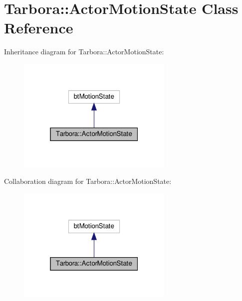 \hypertarget{classTarbora_1_1ActorMotionState}{}\section{Tarbora\+:\+:Actor\+Motion\+State Class Reference}
\label{classTarbora_1_1ActorMotionState}


Inheritance diagram for Tarbora\+:\+:Actor\+Motion\+State\+:\nopagebreak
\begin{figure}[H]
\begin{center}
\leavevmode
\includegraphics[width=211pt]{classTarbora_1_1ActorMotionState__inherit__graph}
\end{center}
\end{figure}


Collaboration diagram for Tarbora\+:\+:Actor\+Motion\+State\+:\nopagebreak
\begin{figure}[H]
\begin{center}
\leavevmode
\includegraphics[width=211pt]{classTarbora_1_1ActorMotionState__coll__graph}
\end{center}
\end{figure}
